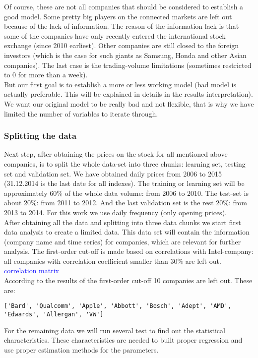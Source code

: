 \documentclass[12pt, a4paper]{article}
\begin{document}
Of course, these are not all companies that should be considered to establish a good model. 
Some pretty big players on the connected markets are left out because of the lack of information. The reason of the information-lack is that some of the companies have only recently entered the international stock exchange (since 2010 earliest). Other companies are still closed to the foreign investors (which is the case for such giants as Samsung, Honda and other Asian companies). The last case is the trading-volume limitations (sometimes restricted to 0 for more than a week).\\
But our first goal is to establish a more or less working model (bad model is actually preferable. This will be explained in details in the results interpretation). We want our original model to be really bad and not flexible, that is why we have limited the number of variables to iterate through.
\subsubsection{Splitting the data}
Next step, after obtaining the prices on the stock for all mentioned above companies, is to split the whole data-set into three chunks: learning set, testing set and validation set. We have obtained daily prices from 2006 to 2015 (31.12.2014 is the last date for all indexes). The training or learning set will be approximately 60\% of the whole data volume: from 2006 to 2010. The test-set is about 20\%: from 2011 to 2012. And the last validation set is the rest 20\%: from 2013 to 2014. For this work we use daily frequency (only opening prices).\\
After obtaining all the data and splitting into three data chunks we start first data analysis to create a limited data. This data set will contain the information (company name and time series) for companies, which are relevant for further analysis. The first-order cut-off is made based on correlations with Intel-company: all companies with correlation coefficient smaller than 30\% are left out. \\
\textcolor{blue}{correlation matrix}\\
According to the results of the first-order cut-off 10 companies are left out.
These are:
\begin{verbatim}
['Bard', 'Qualcomm', 'Apple', 'Abbott', 'Bosch', 'Adept', 'AMD', 
'Edwards', 'Allergan', 'VW']
\end{verbatim}
For the remaining data we will run several test to find out the statistical characteristics. These characteristics are needed to built proper regression and use proper estimation methods for the parameters.
\end{document}
